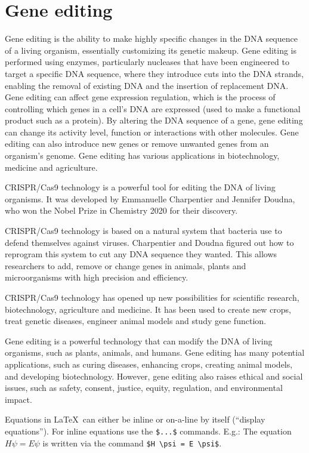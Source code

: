 \documentclass[sn-standardnature]{sn-jnl}%
\theoremstyle{thmstyleone}%
\theoremstyle{thmstyletwo}%
\theoremstyle{thmstylethree}%
\begin{document}
\section*{Gene editing}\label{sec5}


Gene editing is the ability to make highly specific changes in the DNA sequence of a living organism, essentially customizing its genetic makeup. Gene editing is performed using enzymes, particularly nucleases that have been engineered to target a specific DNA sequence, where they introduce cuts into the DNA strands, enabling the removal of existing DNA and the insertion of replacement DNA. Gene editing can affect gene expression regulation, which is the process of controlling which genes in a cell’s DNA are expressed (used to make a functional product such as a protein). By altering the DNA sequence of a gene, gene editing can change its activity level, function or interactions with other molecules. Gene editing can also introduce new genes or remove unwanted genes from an organism’s genome. Gene editing has various applications in biotechnology, medicine and agriculture.

CRISPR/Cas9 technology is a powerful tool for editing the DNA of living organisms. It was developed by Emmanuelle Charpentier and Jennifer Doudna, who won the Nobel Prize in Chemistry 2020 for their discovery.

CRISPR/Cas9 technology is based on a natural system that bacteria use to defend themselves against viruses. Charpentier and Doudna figured out how to reprogram this system to cut any DNA sequence they wanted. This allows researchers to add, remove or change genes in animals, plants and microorganisms with high precision and efficiency.

CRISPR/Cas9 technology has opened up new possibilities for scientific research, biotechnology, agriculture and medicine. It has been used to create new crops, treat genetic diseases, engineer animal models and study gene function.

Gene editing is a powerful technology that can modify the DNA of living organisms, such as plants, animals, and humans. Gene editing has many potential applications, such as curing diseases, enhancing crops, creating animal models, and developing biotechnology. However, gene editing also raises ethical and social issues, such as safety, consent, justice, equity, regulation, and environmental impact.


Equations in \LaTeX\ can either be inline or on-a-line by itself (``display equations''). For
inline equations use the \verb+$...$+ commands. E.g.: The equation
$H\psi = E \psi$ is written via the command \verb+$H \psi = E \psi$+.
\end{document}
